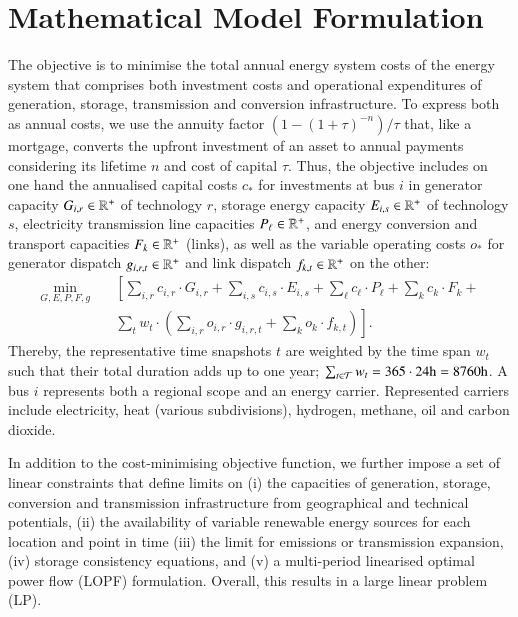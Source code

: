 \section{Mathematical Model Formulation}
\label{sec:si:math}

The objective is to minimise the total annual energy system costs of the energy system
that comprises both investment costs and operational expenditures of generation,
storage, transmission and conversion infrastructure. To express both as annual
costs, we use the annuity factor $(1-(1+\tau)^{-n}) / \tau$ that, like a
mortgage, converts the upfront investment of an asset to annual payments
considering its lifetime $n$ and cost of capital $\tau$. Thus, the objective
includes on one hand the annualised capital costs $c_*$ for investments at bus
$i$ in generator capacity $G_{i,r}\in\mathbb{R}^+$ of technology $r$, storage energy
capacity $E_{i,s}\in\mathbb{R}^+$ of technology $s$, electricity transmission line
capacities $P_{\ell}\in\mathbb{R}^+$, and energy conversion and transport capacities
$F_k\in\mathbb{R}^+$ (links), as well as the variable operating costs $o_*$ for
generator dispatch $g_{i,r,t}\in\mathbb{R}^+$ and link dispatch $f_{k,t}\in\mathbb{R}^+$ on the
other:
\begin{align}
  \label{eq:objective}
  \min_{G,E,P,F,g} \quad &\left[\sum_{i,r} c_{i,r}\cdot G_{i,r} + \sum_{i,s} c_{i,s}\cdot E_{i,s} + \sum_{\ell}c_{\ell}\cdot P_{\ell}+ \sum_{k}c_{k}\cdot F_k +\right. \\
  & \left.  \sum_{t} w_t \cdot \left( \sum_{i,r} o_{i,r} \cdot g_{i,r,t} + \sum_k o_k \cdot f_{k,t} \right) \right].
\end{align}
Thereby, the representative time snapshots $t$ are weighted by the time span
$w_t$ such that their total duration adds up to one year; \mbox{$\sum_{t\in \mathcal{T}}
w_t=365\cdot 24\text{h}=8760\text{h}$}. A bus $i$ represents both a regional
scope and an energy carrier. Represented carriers include electricity, heat
(various subdivisions), hydrogen, methane, oil and carbon dioxide.


In addition to the cost-minimising objective function, we further impose a set
of linear constraints that define limits on (i) the capacities of generation,
storage, conversion and transmission infrastructure from geographical and
technical potentials, (ii) the availability of variable renewable energy sources
for each location and point in time (iii) the limit for \co emissions or transmission expansion, (iv)
storage consistency equations, and (v) a multi-period linearised optimal power
flow (LOPF) formulation. Overall, this results in a large linear problem (LP).

